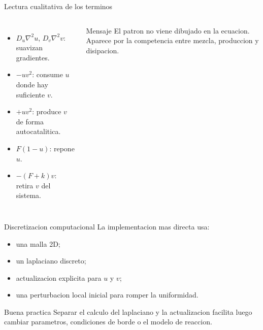 \begin{frame}{Lectura cualitativa de los terminos}
\begin{columns}[T,onlytextwidth]
\begin{itemize}
    \item $D_u \nabla^2 u$, $D_v \nabla^2 v$: suavizan gradientes.
    \item $-uv^2$: consume $u$ donde hay suficiente $v$.
    \item $+uv^2$: produce $v$ de forma autocatalitica.
    \item $F(1-u)$: repone $u$.
    \item $-(F+k)v$: retira $v$ del sistema.
\end{itemize}

\begin{alertblock}{Mensaje}
El patron no viene dibujado en la ecuacion. Aparece por la competencia entre mezcla, produccion y disipacion.
\end{alertblock}

\end{columns}
\end{frame}

\begin{frame}{Discretizacion computacional}
\justifying
La implementacion mas directa usa:
\begin{itemize}
    \item una malla 2D;
    \item un laplaciano discreto;
    \item actualizacion explicita para $u$ y $v$;
    \item una perturbacion local inicial para romper la uniformidad.
\end{itemize}

\begin{block}{Buena practica}
Separar el calculo del laplaciano y la actualizacion facilita luego cambiar parametros, condiciones de borde o el modelo de reaccion.
\end{block}
\end{frame}

